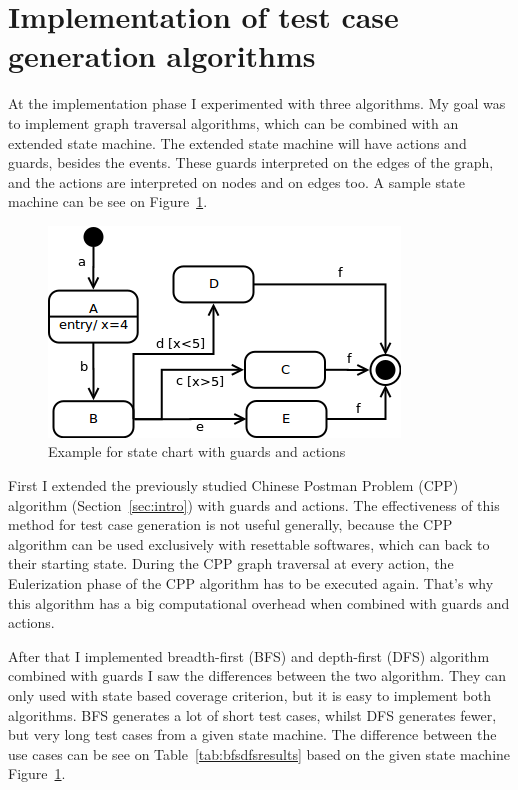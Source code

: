 \documentclass{article}
\begin{document}
\newpage

\section{Implementation of test case generation algorithms}
\label{sec:implementation}

At the implementation phase I experimented with three algorithms. My goal was to implement graph traversal algorithms, which can be combined with an extended state machine. The extended state machine will have actions and guards, besides the events. These guards interpreted on the edges of the graph, and the actions are interpreted on nodes and on edges too. A sample state machine can be see on Figure~\ref{fig:statechartguard}.

\begin{figure}[htp]
\centering
\includegraphics[scale=0.5]{img/guard1.png}
\caption{Example for state chart with guards and actions}
\label{fig:statechartguard}
\end{figure}

First I extended the previously studied Chinese Postman Problem (CPP) algorithm (Section~\ref{sec:intro}) with guards and actions. The effectiveness of this method for test case generation is not useful generally, because the CPP algorithm can be used exclusively with resettable softwares, which can back to their starting state. During the CPP graph traversal at every action, the Eulerization phase of the CPP algorithm has to be executed again. That's why this algorithm has a big computational overhead when combined with guards and actions.

After that I implemented breadth-first (BFS) and depth-first (DFS) algorithm combined with guards I saw the differences between the two algorithm. They can only used with state based coverage criterion, but it is easy to implement both algorithms. BFS generates a lot of short test cases, whilst DFS generates fewer, but very long test cases from a given state machine. The difference between the use cases can be see on Table~\ref{tab:bfsdfsresults} based on the given state machine Figure~\ref{fig:statechartguard}.
\end{document}
